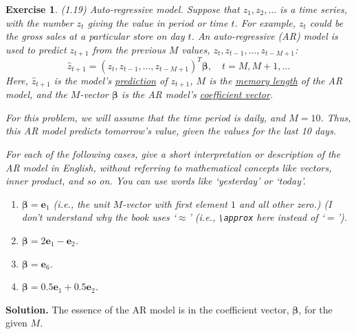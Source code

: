 \documentclass[11pt]{book}
\theoremstyle{definition}
\theoremstyle{plain}
\newtheorem{exercise}{Exercise}[chapter]
\theoremstyle{problemstyle}
\theoremstyle{remark}
\theoremstyle{definition}
\begin{document}
\begin{exercise}
    (1.19) Auto-regressive model. Suppose that $z_1,z_2,\dots$ is a time series, with the number $z_t$ giving the value in period or time $t$. For example, $z_t$ could be the gross sales at a particular store on day $t$. An auto-regressive (AR) model is used to predict $z_{t+1}$ from the previous $M$ values, $z_{\scriptscriptstyle t},z_{\scriptscriptstyle t-1},\dots,z_{\scriptscriptstyle t-M+1}$:
    \begin{equation}
        \label{eq:ar-model}
        \hat{z}_{\scriptscriptstyle t+1} = (z_{\scriptscriptstyle t},z_{\scriptscriptstyle t-1},\dots,z_{\scriptscriptstyle t-M+1})^T\boldsymbol{\beta},\quad t=M,M+1,\dots
    \end{equation}
    Here, $\hat{z}_{\scriptscriptstyle t+1}$ is the model's \underline{prediction} of $z_{\scriptscriptstyle t+1}$, $M$ is the \underline{memory length} of the AR model, and the $M$-vector $\boldsymbol{\beta}$ is the AR model's \underline{coefficient vector}.

    For this problem, we will assume that the time period is daily, and $M=10$. Thus, this AR model predicts tomorrow's value, given the values for the last 10 days.

    For each of the following cases, give a short interpretation or description of the AR model in English, without referring to mathematical concepts like vectors, inner product, and so on. You can use words like `yesterday' or `today'.

\begin{enumerate}[label=(\alph*)]
    \item $\boldsymbol\beta=\boldsymbol{e}_1$ (i.e., the unit $M$-vector with first element $1$ and all other zero.) (I don't understand why the book uses `$\approx$' (i.e., \verb|\approx| here instead of `$=$').
    \item $\boldsymbol\beta=2\boldsymbol{e}_1-\boldsymbol{e}_2$.
    \item $\boldsymbol\beta=\boldsymbol{e}_6$.
    \item $\boldsymbol\beta=0.5\boldsymbol{e}_1+0.5\boldsymbol{e}_2$.
\end{enumerate}
\end{exercise}
\textbf{Solution.}
The essence of the AR model is in the coefficient vector, $\boldsymbol\beta$, for the given $M$.
\end{document}
